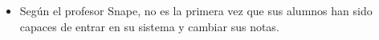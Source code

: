 \begin{itemize}
\item Según el profesor Snape, no es la primera vez que sus alumnos han sido capaces de entrar en su sistema y cambiar sus notas.
\end{itemize}
